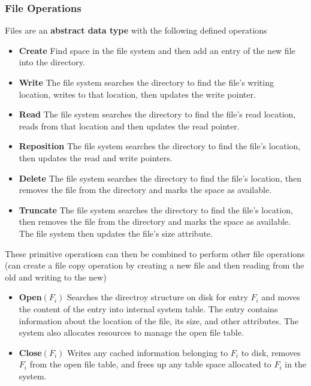 \documentclass{book/custombook}
\begin{document}
                \subsubsection{File Operations}
                    Files are an \textbf{abstract data type} with the following defined operations
                    \begin{itemize}
                        \item \textbf{Create}
                            \subitem Find space in the file system and then add an entry of the new file into the directory.
                        \item \textbf{Write}
                            \subitem The file system searches the directory to find the file's writing location, writes to that location,
                            then updates the write pointer.
                        \item \textbf{Read}
                            \subitem The file system searches the directory to find the file's read location, reads from that
                            location and then updates the read pointer.
                        \item \textbf{Reposition}
                            \subitem The file system searches the directory to find the file's location, then updates the read
                            and write pointers.
                        \item \textbf{Delete}
                            \subitem The file system searches the directory to find the file's location, then removes the file 
                            from the directory and marks the space as available.
                        \item \textbf{Truncate}
                            \subitem The file system searches the directory to find the file's location, then removes the file 
                            from the directory and marks the space as available. The file system then updates the file's size 
                            attribute.
                    \end{itemize}
                    These primitive operatiosn can then be combined to perform other file operations (can create a file copy operation
                    by creating a new file and then reading from the old and writing to the new)
                    \begin{itemize}
                        \item \textbf{Open}$(F_i)$ 
                            \subitem Searches the directroy structure on disk for entry $F_i$ and moves the content of the entry 
                            into internal system table. The entry contains information about the location of the file, its size, 
                            and other attributes. The system also allocates resources to manage the open file table. 
                        \item \textbf{Close}$(F_i)$
                            \subitem Writes any cached information belonging to $F_i$ to disk, removes $F_i$ from the open file table, 
                            and frees up any table space allocated to $F_i$ in the system.
                    \end{itemize}
\end{document}
